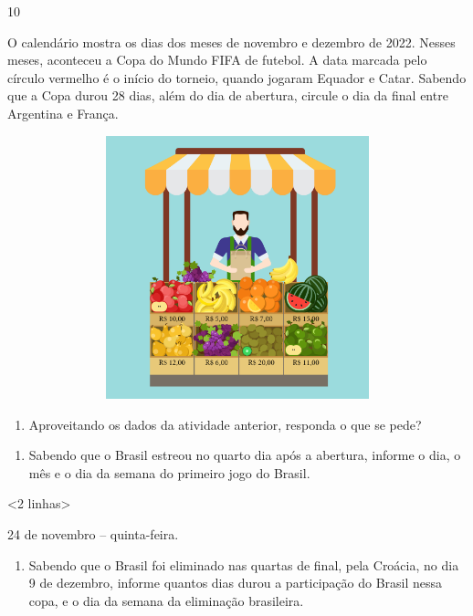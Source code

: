{{{{{\num{10}

O calendário mostra os dias dos meses de novembro e dezembro de
2022. Nesses meses, aconteceu a Copa do Mundo FIFA de futebol. A data
marcada pelo círculo vermelho é o início do torneio, quando jogaram
Equador e Catar. Sabendo que a Copa durou 28 dias, além do dia de abertura, circule o dia da
final entre Argentina e França.


\includegraphics[width=6.01042in,height=3.00521in]{media/image65.png}


\begin{enumerate}
\def\labelenumi{\arabic{enumi}.}
\item
  Aproveitando os dados da atividade anterior, responda o que se pede?
\end{enumerate}

\begin{enumerate}
\def\labelenumi{\alph{enumi})}
\item
  Sabendo que o Brasil estreou no quarto dia após a abertura, informe o dia, o
  mês e o dia da semana do primeiro jogo do Brasil.
\end{enumerate}

\textless{}2 linhas\textgreater{}

24 de novembro -- quinta-feira.

\begin{enumerate}
\def\labelenumi{\alph{enumi})}
\item
  Sabendo que o Brasil foi eliminado nas quartas de final, pela Croácia,
  no dia 9 de dezembro, informe quantos dias durou a participação do
  Brasil nessa copa, e o dia da semana da eliminação brasileira.
\end{enumerate}

}}}}}

